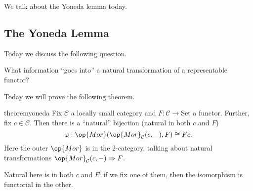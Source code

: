 \documentclass[../notes.tex]{subfiles}
\begin{document}

We talk about the Yoneda lemma today.

\subsection{The Yoneda Lemma}
Today we discuss the following question.
\begin{ques}
	What information ``goes into'' a natural transformation of a representable functor?
\end{ques}
Today we will prove the following theorem.
\begin{restatable}{theorem}{yoneda} \label{thm:yoneda}
	Fix $\mathcal C$ a locally small category and $F:\mathcal C\to\mathrm{Set}$ a functor. Further, fix $c\in\mathcal C$. Then there is a ``natural'' bijection (natural in both $c$ and $F$)
	\[\varphi:\op{Mor}(\op{Mor}_\mathcal C(c,-),F)\cong Fc.\]
	Here the outer $\op{Mor}$ is in the $2$-category, talking about natural transformations $\op{Mor}_\mathcal C(c,-)\Rightarrow F$.
\end{restatable}
\noindent Natural here is in both $c$ and $F$: if we fix one of them, then the isomorphism is functorial in the other.
\end{document}
